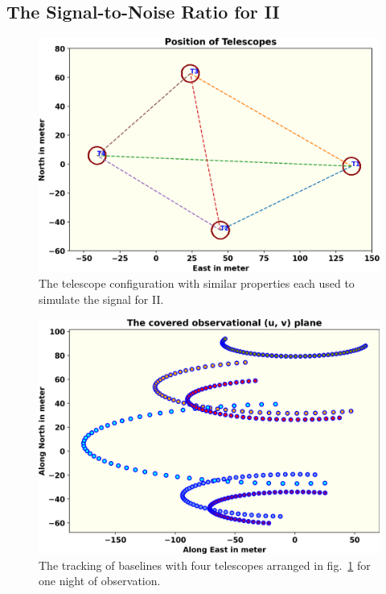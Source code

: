 \subsection{The Signal-to-Noise Ratio for II}
\begin{figure}
	\centering
	\includegraphics[width=\linewidth]{fig/telescope.png}
	\caption{The telescope configuration with similar properties each used to simulate the signal for II.}
	\label{fig:teles}
\end{figure}
\begin{figure}
	\centering
	\includegraphics[width=\linewidth]{fig/baseline.png}
	\caption{The tracking of baselines with four telescopes arranged in fig.~\ref{fig:teles} for one night of observation.}
	\label{fig:base}
\end{figure}

